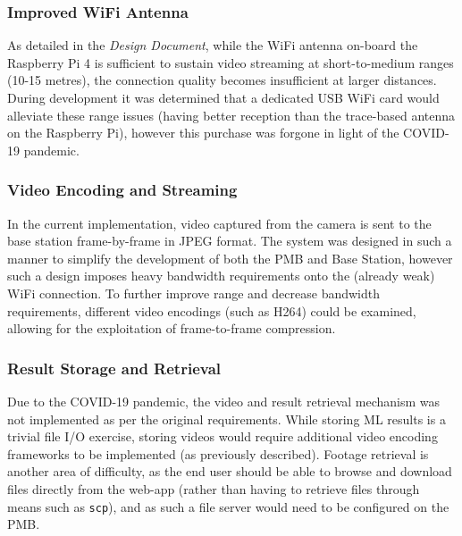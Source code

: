 \documentclass[10pt,letterpaper]{article}
\begin{document}
\subsubsection{Improved WiFi Antenna}
As detailed in the \textit{Design Document}, while the WiFi antenna on-board the Raspberry Pi 4 is sufficient to sustain video streaming at short-to-medium ranges (10-15 metres), the connection quality becomes insufficient at larger distances. During development it was determined that a dedicated USB WiFi card would alleviate these range issues (having better reception than the trace-based antenna on the Raspberry Pi), however this purchase was forgone in light of the COVID-19 pandemic. 

\subsubsection{Video Encoding and Streaming}
In the current implementation, video captured from the camera is sent to the base station frame-by-frame in JPEG format. The system was designed in such a manner to simplify the development of both the PMB and Base Station, however such a design imposes heavy bandwidth requirements onto the (already weak) WiFi connection. To further improve range and decrease bandwidth requirements, different video encodings (such as H264) could be examined, allowing for the exploitation of frame-to-frame compression.

\subsubsection{Result Storage and Retrieval}
Due to the COVID-19 pandemic, the video and result retrieval mechanism was not implemented as per the original requirements. While storing ML results is a trivial file I/O exercise, storing videos would require additional video encoding frameworks to be implemented (as previously described). Footage retrieval is another area of difficulty, as the end user should be able to browse and download files directly from the web-app (rather than having to retrieve files through means such as \texttt{scp}), and as such a file server would need to be configured on the PMB.  

\clearpage
{}



\end{document}

